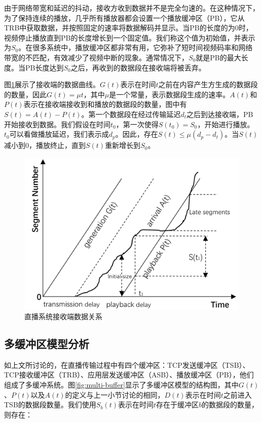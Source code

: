 由于网络带宽和延迟的抖动，接收方收到数据并不是完全匀速的。在这种情况下，为了保持连续的播放，几乎所有播放器都会设置一个播放缓冲区（PB），它从TRB中获取数据，并按照固定的速率将数据解码并显示。当PB的长度的为0时，视频停止播放直到PB的长度增长到一个固定值。我们称这个值为初始值，并表示为$S_0$。在很多系统中，播放缓冲区都非常有用，它弥补了短时间视频码率和网络带宽的不匹配，有效减少了视频中断的现象。通常情况下，$S_0$就是PB的最大长度。当PB长度达到$S_0$之后，再收到的数据段在接收端将被丢弃。

图\ref{fig:receiving-data}展示了接收端的数据曲线。$G(t)$表示在时间$t$之前在内容产生方生成的数据段的数量，因此$G(t) = \mu t$，其中$\mu$是一个常量，表示数据段生成的速率。$A(t)$和$P(t)$表示在接收端接收到和播放的数据段的数量，图中有$S(t) = A(t) - P(t)$。第一个数据段在经过传输延迟$d_t$之后到达接收端，PB开始接收到数据。我们假设在时间$t_0$，第一次使得$S(t_0)=S_0$，开始进行播放。$t_0$可以看做播放延迟，我们表示成$d_p$。因此，存在$S(t) \le \mu (d_p - d_t)$。当$S(t)$减小到$0$，播放终止，直到$S(t)$重新增长到$S_0$。

\begin{figure}[t]
	\centering
	\includegraphics[width = 0.85\linewidth]{figures/receiving-data.png}
	\caption{直播系统接收端数据关系\label{fig:receiving-data}}
\end{figure}

\subsection{多缓冲区模型分析}

如上文所讨论的，在直播传输过程中有四个缓冲区：TCP发送缓冲区（TSB）、TCP接收缓冲区（TRB）、应用层发送缓冲区（ASB）、播放缓冲区（PB），他们组成了多缓冲系统。图\ref{fig:multi-buffer}显示了多缓冲区模型的结构图，其中$G(t)$、$P(t)$以及$A(t)$的定义与上一小节讨论的相同，$D(t)$表示在时间$t$之前进入TSB的数据段数量。我们使用$S_b(t)$表示在时间$t$存在于缓冲区$b$的数据段的数量，则存在：

